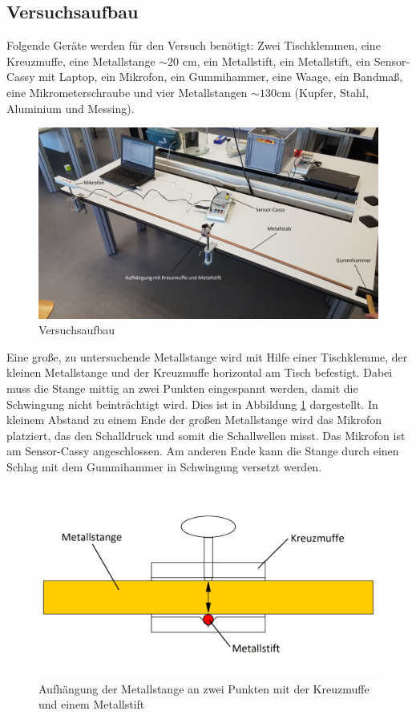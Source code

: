 \documentclass[a4paper, 12pt]{scrartcl}
\begin{document}
\subsection{Versuchsaufbau}

Folgende Geräte werden für den Versuch benötigt: Zwei Tischklemmen, eine Kreuzmuffe, eine Metallstange $\sim 20$ cm, ein Metallstift, ein Metallstift, ein Sensor-Cassy mit Laptop, ein Mikrofon, ein Gummihammer, eine Waage, ein Bandmaß, eine Mikrometerschraube und vier Metallstangen $\sim 130$cm (Kupfer, Stahl, Aluminium und Messing).

\begin{figure}[h]
	\centering
	\includegraphics[width=\linewidth]{bilder/aufbau_festkoerper.jpg}
	\caption{Versuchsaufbau}
\end{figure}

Eine große, zu untersuchende Metallstange wird mit Hilfe einer Tischklemme, der kleinen Metallstange und der Kreuzmuffe horizontal am Tisch befestigt. Dabei muss die Stange mittig an zwei Punkten eingespannt werden, damit die Schwingung nicht beinträchtigt wird. Dies ist in Abbildung \ref{pic:aufhaengung} dargestellt. In kleinem Abstand zu einem Ende der großen Metallstange wird das Mikrofon platziert, das den Schalldruck und somit die Schallwellen misst. Das Mikrofon ist am Sensor-Cassy angeschlossen. Am anderen Ende kann die Stange durch einen Schlag mit dem Gummihammer in Schwingung versetzt werden.

\begin{figure}[h]
	\centering
	\includegraphics[width=\linewidth]{bilder/aufhaengung_beschriftet.png}
	\caption{Aufhängung der Metallstange an zwei Punkten mit der Kreuzmuffe und einem Metallstift}
	\label{pic:aufhaengung}
\end{figure}
\end{document}
